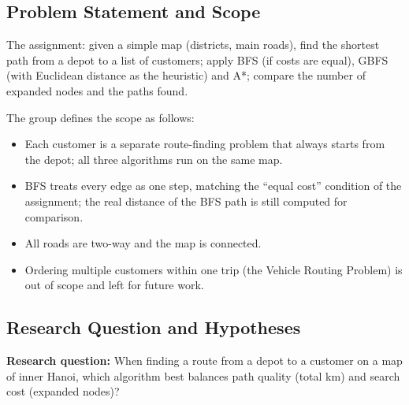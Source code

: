 \documentclass[12pt,a4paper]{article}
\providecommand{\tightlist}{\setlength{\itemsep}{0pt}\setlength{\parskip}{0pt}}
\begin{document}
\subsection{Problem Statement and Scope}

The assignment: given a simple map (districts, main roads),
find the shortest path from a depot to a list of customers;
apply BFS (if costs are equal), GBFS (with Euclidean
distance as the heuristic) and A*; compare the number of
expanded nodes and the paths found.

The group defines the scope as follows:

\begin{itemize}
\tightlist
\item
  Each customer is a separate route-finding problem that
  always starts from the depot; all three algorithms run on
  the same map.
\item
  BFS treats every edge as one step, matching the ``equal
  cost'' condition of the assignment; the real distance of
  the BFS path is still computed for comparison.
\item
  All roads are two-way and the map is connected.
\item
  Ordering multiple customers within one trip (the Vehicle
  Routing Problem) is out of scope and left for future work.
\end{itemize}

\subsection{Research Question and Hypotheses}

\textbf{Research question:} When finding a route from a
depot to a customer on a map of inner Hanoi, which algorithm
best balances path quality (total km) and search cost
(expanded nodes)?
\end{document}
